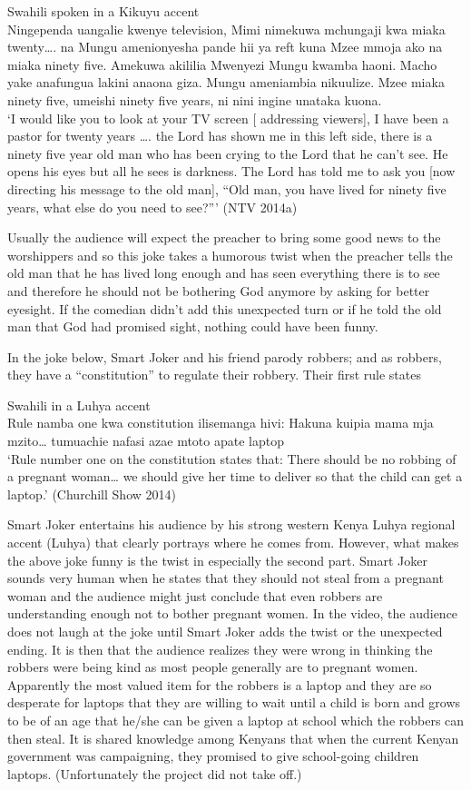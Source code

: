 \documentclass[output=paper]{langsci/langscibook}
\begin{document}
\ea\label{ex:muaka:8}
Swahili spoken in a Kikuyu accent\\ 
Ningependa uangalie kwenye television, Mimi nimekuwa mchungaji kwa miaka twenty…. na Mungu amenionyesha pande hii ya reft kuna Mzee mmoja ako na miaka ninety five. Amekuwa akililia Mwenyezi Mungu kwamba haoni. Macho yake anafungua lakini anaona giza. Mungu ameniambia nikuulize. Mzee miaka ninety five, umeishi ninety five years, ni nini ingine unataka kuona.\\
\glt ‘I would like you to look at your TV screen [ addressing viewers], I have been a pastor for twenty years …. the Lord has shown me in this left side, there is a ninety five year old man who has been crying to the Lord that he can’t see. He opens his eyes but all he sees is darkness. The Lord has told me to ask you [now directing his message to the old man], “Old man, you have lived for ninety five years, what else do you need to see?”’  (NTV 2014a)
\z

Usually the audience will expect the preacher to bring some good news to the worshippers and so this joke takes a humorous twist when the preacher tells the old man that he has lived long enough and has seen everything there is to see and therefore he should not be bothering God anymore by asking for better eyesight. If the comedian didn’t add this unexpected turn or if he told the old man that God had promised sight, nothing could have been funny. 

In the joke below, Smart Joker and his friend parody robbers; and as robbers, they have a “constitution” to regulate their robbery. Their first rule states

\ea\label{ex:muaka:9}
{Swahili in a Luhya accent}\\
 Rule namba one kwa constitution ilisemanga hivi: Hakuna kuipia mama mja mzito… tumuachie nafasi azae mtoto apate laptop\\
\glt ‘Rule number one on the constitution states that: There should be no robbing of a pregnant woman… we should give her time to deliver so that the child can get a laptop.’ (Churchill Show 2014)
\z

Smart Joker entertains his audience by his strong western Kenya Luhya regional accent (Luhya) that clearly portrays where he comes from. However, what makes the above joke funny is the twist in especially the second part. Smart Joker sounds very human when he states that they should not steal from a pregnant woman and the audience might just conclude that even robbers are understanding enough not to bother pregnant women. In the video, the audience does not laugh at the joke until Smart Joker adds the twist or the unexpected ending. It is then that the audience realizes they were wrong in thinking the robbers were being kind as most people generally are to pregnant women. Apparently the most valued item for the robbers is a laptop and they are so desperate for laptops that they are willing to wait until a child is born and grows to be of an age that he/she can be given a laptop at school which the robbers can then steal. It is shared knowledge among Kenyans that when the current Kenyan government was campaigning, they promised to give school-going children laptops. (Unfortunately the project did not take off.) 
\end{document}
